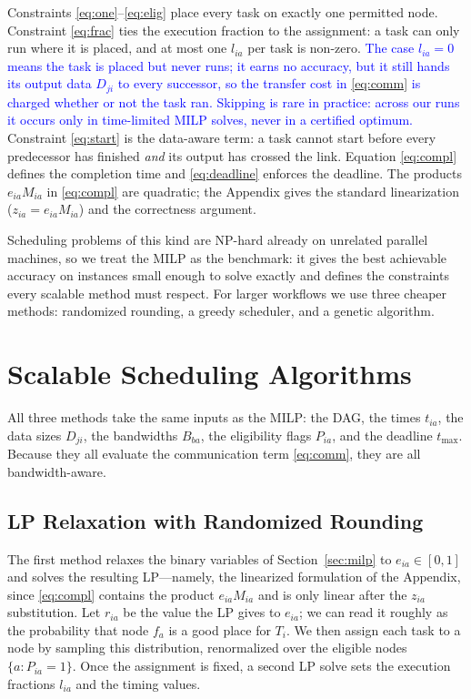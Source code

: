 \documentclass[conference]{IEEEtran}
\newcommand{\rev}[1]{\textcolor{blue}{#1}}%
\begin{document}
Constraints \eqref{eq:one}--\eqref{eq:elig} place every task on exactly one permitted node. Constraint \eqref{eq:frac} ties the execution fraction to the assignment: a task can only run where it is placed, and at most one $l_{ia}$ per task is non-zero. \rev{The case $l_{ia}=0$ means the task is placed but never runs; it earns no accuracy, but it still hands its output data $D_{ji}$ to every successor, so the transfer cost in \eqref{eq:comm} is charged whether or not the task ran. Skipping is rare in practice: across our runs it occurs only in time-limited MILP solves, never in a certified optimum.} Constraint \eqref{eq:start} is the data-aware term: a task cannot start before every predecessor has finished \emph{and} its output has crossed the link. Equation \eqref{eq:compl} defines the completion time and \eqref{eq:deadline} enforces the deadline. The products $e_{ia}M_{ia}$ in \eqref{eq:compl} are quadratic; the Appendix gives the standard linearization ($z_{ia}=e_{ia}M_{ia}$) and the correctness argument.

Scheduling problems of this kind are NP-hard already on unrelated
parallel machines, so we treat the MILP
as the benchmark: it gives the best achievable accuracy on instances
small enough to solve exactly and defines the constraints every scalable
method must respect. For larger workflows we use three cheaper methods:
randomized rounding, a greedy scheduler,
and a genetic algorithm.

\section{Scalable Scheduling Algorithms}
\label{sec:algorithms}

All three methods take the same inputs as the MILP: the DAG, the times $t_{ia}$, the data sizes $D_{ji}$, the bandwidths $B_{ba}$, the eligibility flags $P_{ia}$, and the deadline $t_{\max}$. Because they all evaluate the communication term \eqref{eq:comm}, they are all bandwidth-aware.

\subsection{LP Relaxation with Randomized Rounding}

The first method relaxes the binary variables of Section~\ref{sec:milp} to $e_{ia}\in[0,1]$ and solves the resulting LP---namely, the linearized formulation of the Appendix, since \eqref{eq:compl} contains the product $e_{ia}M_{ia}$ and is only linear after the $z_{ia}$ substitution. Let $r_{ia}$ be the value the LP gives to $e_{ia}$; we can read it roughly as the probability that node $f_a$ is a good place for $T_i$. We then assign each task to a node by sampling this distribution, renormalized over the eligible nodes $\{a:P_{ia}=1\}$. Once the assignment is fixed, a second LP solve sets the execution fractions $l_{ia}$ and the timing values.
\end{document}
